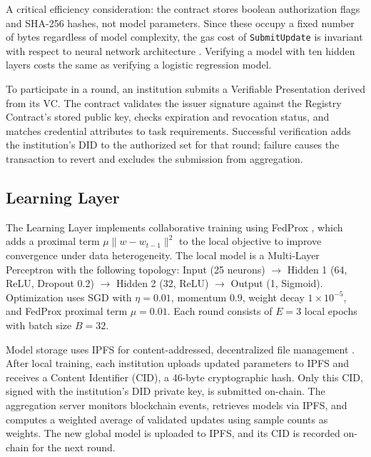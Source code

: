 \documentclass[english]{sbc2025}
\begin{document}
A critical efficiency consideration: the contract stores boolean authorization flags and SHA-256 hashes, not model parameters. Since these occupy a fixed number of bytes regardless of model complexity, the gas cost of \texttt{SubmitUpdate} is invariant with respect to neural network architecture \citep{MADRIGALCIANCI2025107700}. Verifying a model with ten hidden layers costs the same as verifying a logistic regression model.

To participate in a round, an institution submits a Verifiable Presentation derived from its VC. The contract validates the issuer signature against the Registry Contract's stored public key, checks expiration and revocation status, and matches credential attributes to task requirements. Successful verification adds the institution's DID to the authorized set for that round; failure causes the transaction to revert and excludes the submission from aggregation.

\subsection{Learning Layer}

The Learning Layer implements collaborative training using FedProx \citep{li2020federated}, which adds a proximal term $\mu \|w - w_{t-1}\|^2$ to the local objective to improve convergence under data heterogeneity. The local model is a Multi-Layer Perceptron with the following topology: Input (25 neurons) $\rightarrow$ Hidden 1 (64, ReLU, Dropout 0.2) $\rightarrow$ Hidden 2 (32, ReLU) $\rightarrow$ Output (1, Sigmoid). Optimization uses SGD with $\eta=0.01$, momentum $0.9$, weight decay $1 \times 10^{-5}$, and FedProx proximal term $\mu=0.01$. Each round consists of $E=3$ local epochs with batch size $B=32$.

Model storage uses IPFS for content-addressed, decentralized file management \citep{technologies12090168}. After local training, each institution uploads updated parameters to IPFS and receives a Content Identifier (CID), a 46-byte cryptographic hash. Only this CID, signed with the institution's DID private key, is submitted on-chain. The aggregation server monitors blockchain events, retrieves models via IPFS, and computes a weighted average of validated updates using sample counts as weights. The new global model is uploaded to IPFS, and its CID is recorded on-chain for the next round.
\end{document}
